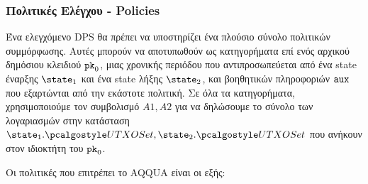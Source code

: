 \subsubsection{Πολιτικές Ελέγχου - Policies}
Ένα ελεγχόμενο DPS θα πρέπει να υποστηρίζει ένα πλούσιο σύνολο πολιτικών συμμόρφωσης. Αυτές μπορούν να αποτυπωθούν ως κατηγορήματα επί ενός αρχικού δημόσιου κλειδιού $\textup{\texttt{pk}}_{0}$, μιας χρονικής περιόδου που αντιπροσωπεύεται από ένα state έναρξης $\snap_1$ και ένα state λήξης $\snap_2$, και βοηθητικών πληροφοριών ${\textup{\texttt{aux}}}$ που εξαρτώνται από την εκάστοτε πολιτική. Σε όλα τα κατηγορήματα, χρησιμοποιούμε τον συμβολισμό $A1, A2$ για να δηλώσουμε το σύνολο των λογαριασμών στην κατάσταση $\snap_1.\utxoset, \snap_2.\utxoset$ που ανήκουν στον ιδιοκτήτη του $\textup{\texttt{pk}}_{0}$.

Οι πολιτικές που επιτρέπει το AQQUA είναι οι εξής:

